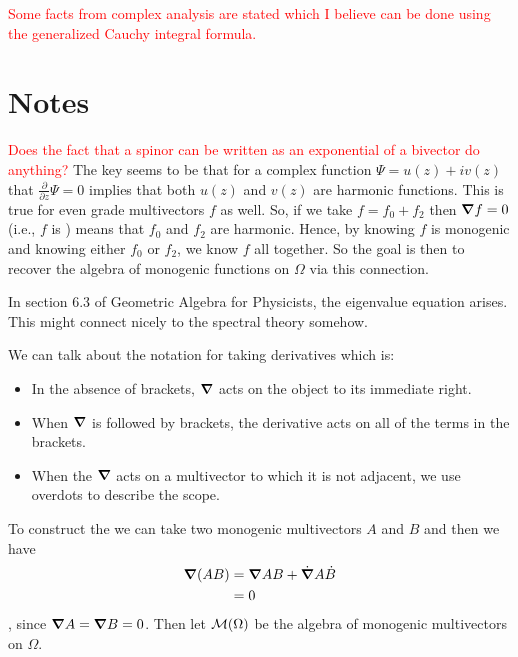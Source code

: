 \textcolor{red}{Some facts from complex analysis are stated which I believe can be done using the generalized Cauchy integral formula.}

\newpage
\section*{Notes}
\textcolor{red}{Does the fact that a spinor can be written as an exponential of a bivector do anything?}
The key seems to be that for a complex function $\Psi=u(z)+iv(z)$ that $\frac{\partial}{\partial z} \Psi =0$ implies that both $u(z)$ and $v(z)$ are harmonic functions. This is true for even grade multivectors $f$ as well. So, if we take $f=f_0+f_2$ then $\boldsymbol{\nabla} f =0$ (i.e., $f$ is ) means that $f_0$ and $f_2$ are harmonic.  Hence, by knowing $f$ is monogenic and knowing either $f_0$ or $f_2$, we know $f$ all together.  So the goal is then to recover the algebra of monogenic functions on $\Omega$ via this connection.

In section 6.3 of Geometric Algebra for Physicists, the eigenvalue equation arises. This might connect nicely to the spectral theory somehow.

We can talk about the notation for taking derivatives which is:
\begin{itemize}
    \item In the absence of brackets, $\boldsymbol{\nabla}$ acts on the object to its immediate right.
    \item When $\boldsymbol{\nabla}$ is followed by brackets, the derivative acts on all of the terms in the brackets.
    \item When the $\boldsymbol{\nabla}$ acts on a multivector to which it is not adjacent, we use overdots to describe the scope.
\end{itemize}
To construct the  we can take two monogenic multivectors $A$ and $B$ and then we have
\begin{align*}
\boldsymbol{\nabla} (AB) &= \boldsymbol{\nabla} AB + \dot{\boldsymbol{\nabla}}A\dot{B}\\
&= 0
\end{align*},
since $\boldsymbol{\nabla} A=\boldsymbol{\nabla} B=0$. Then let $\mathcal{M}(\Omega)$ be the algebra of monogenic multivectors on $\Omega$.

